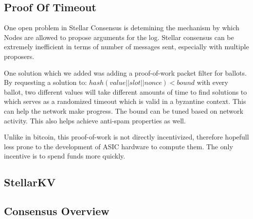 \documentclass[preprint,11pt]{article}
\begin{document}
\subsection{Proof Of Timeout}
One open problem in Stellar Consensus is detemining the mechanism by
which Nodes are allowed to propose arguments for the log. Stellar
consensus can be extremely inefficient in terms of number of messages
sent, especially with multiple proposers.

One solution which we added was adding a proof-of-work packet filter for
ballots. By requesting a solution to: $hash(value || slot || nonce) < bound$
with every ballot, two different values will take different amounts of
time to find solutions to which serves as a randomized timeout which
is valid in a byzantine context. This can help the network make
progress. The bound can be tuned based on network activity. This also helps
achieve anti-spam properties as well.

Unlike in bitcoin, this proof-of-work is not directly incentivized,
therefore hopefull less prone to the development of ASIC hardware to
compute them. The only incentive is to spend funds more quickly.

\subsection{StellarKV}
\subsection{Consensus Overview}
\end{document}
